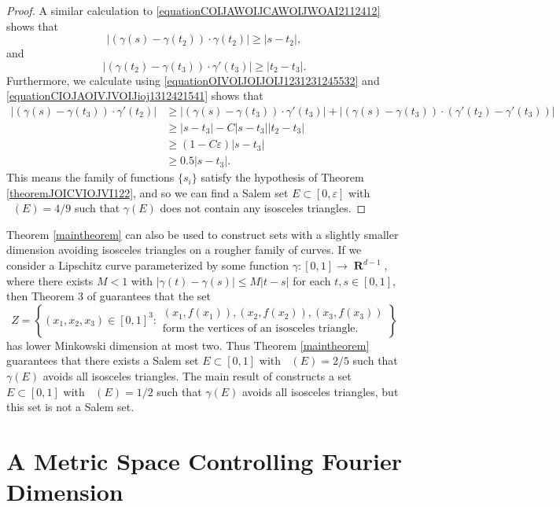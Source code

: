 \documentclass[dvipsnames,letterpaper,12pt]{article}
\numberwithin{equation}{section}
\DeclareMathOperator{\hausdim}{\dim_{\mathbf{H}}}
\DeclareMathOperator{\fordim}{\dim_{\mathbf{F}}}
\DeclareMathOperator{\RR}{\mathbf{R}}
\numberwithin{theorem}{section}
\begin{document}
\begin{proof}
    A similar calculation to \eqref{equationCOIJAWOIJCAWOIJWOAI2112412} shows that
    \[ |(\gamma(s) - \gamma(t_2)) \cdot \gamma(t_2)| \geq |s - t_2|, \]
    and
    \[ |(\gamma(t_2) - \gamma(t_3)) \cdot \gamma'(t_3)| \geq |t_2 - t_3|. \]
    Furthermore, we calculate using \eqref{equationOIVOIJOIJOIJ1231231245532} and \eqref{equationCIOJAOIVJVOIJioj1312421541} shows that
    \begin{align*}
        |(\gamma(s) - \gamma(t_3)) \cdot \gamma'(t_2)| &\geq |(\gamma(s) - \gamma(t_3)) \cdot \gamma'(t_3)| + |(\gamma(s) - \gamma(t_3)) \cdot (\gamma'(t_2) - \gamma'(t_3))|\\
        &\geq |s - t_3| - C|s - t_3||t_2 - t_3|\\
        &\geq (1 - C\varepsilon) |s - t_3|\\
        &\geq 0.5 |s - t_3|.
    \end{align*}
    This means the family of functions $\{ s_i \}$ satisfy the hypothesis of Theorem \ref{theoremJOICVIOJVI122}, and so we can find a Salem set $E \subset [0,\varepsilon]$ with $\fordim(E) = 4/9$ such that $\gamma(E)$ does not contain any isosceles triangles.
\end{proof}

Theorem \ref{maintheorem} can also be used to construct sets with a slightly smaller dimension avoiding isosceles triangles on a rougher family of curves. If we consider a Lipschitz curve parameterized by some function $\gamma: [0,1] \to \RR^{d-1}$, where there exists $M < 1$ with $|\gamma(t) - \gamma(s)| \leq M |t - s|$ for each $t,s \in [0,1]$, then Theorem 3 of \cite{OurPaper} guarantees that the set
%
\[ Z = \left\{ (x_1,x_2,x_3) \in [0,1]^3 : \begin{array}{c}
            \text{$(x_1,f(x_1)), (x_2,f(x_2)), (x_3,f(x_3))$}\\
            \text{form the vertices of an isosceles triangle.} \end{array} \right\} \]
%
has lower Minkowski dimension at most two. Thus Theorem \ref{maintheorem} guarantees that there exists a Salem set $E \subset [0,1]$ with $\fordim(E) = 2/5$ such that $\gamma(E)$ avoids all isosceles triangles. The main result of \cite{PramanikFraser} constructs a set $E \subset [0,1]$ with $\hausdim(E) = 1/2$ such that $\gamma(E)$ avoids all isosceles triangles, but this set is not a Salem set.



\section{A Metric Space Controlling Fourier Dimension}
\end{document}
